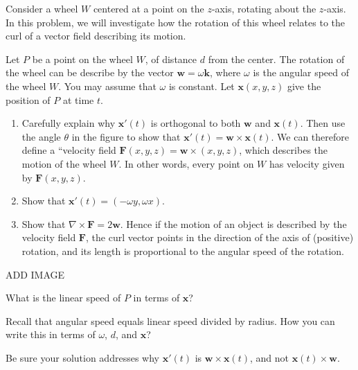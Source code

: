 \begin{problem}
Consider a wheel $W$ centered at a point on the $z$-axis, rotating about the $z$-axis. In this problem, we will investigate how the rotation of this wheel relates to the curl of a vector field describing its motion.

Let $P$ be a point on the wheel $W$, of distance $d$ from the center. The rotation of the wheel can be describe by the vector $\mathbf{w}=\omega\mathbf{k}$, where $\omega$ is the angular speed of the wheel $W$. You may assume that $\omega$ is constant. Let $\mathbf{x}(x,y,z)$ give the position of $P$ at time $t$.

\begin{enumerate}
\item Carefully explain why $\mathbf{x}'(t)$ is orthogonal to both $\mathbf{w}$ and $\mathbf{x}(t)$. Then use the angle $\theta$ in the figure to show that $\mathbf{x}'(t) = \mathbf{w}\times\mathbf{x}(t)$. We can therefore define a ``velocity field $\mathbf{F}(x,y,z) = \mathbf{w}\times(x,y,z)$, which describes the motion of the wheel $W$. In other words, every point on $W$ has velocity given by $\mathbf{F}(x,y,z)$.
\item Show that $\mathbf{x}'(t) = (-\omega y, \omega x)$.
\item Show that $\nabla\times\mathbf{F} = 2\mathbf{w}$. Hence if the motion of an object is described by the velocity field $\mathbf{F}$, the curl vector points in the direction of the axis of (positive) rotation, and its length is proportional to the angular speed of the rotation.
\end{enumerate}

ADD IMAGE

\begin{hint}
What is the linear speed of $P$ in terms of $\mathbf{x}$?

Recall that angular speed equals linear speed divided by radius. How you can write this in terms of $\omega$, $d$, and $\mathbf{x}$?

Be sure your solution addresses why $\mathbf{x}'(t)$ is $\mathbf{w}\times\mathbf{x}(t)$, and not $\mathbf{x}(t)\times\mathbf{w}$.
\end{hint}
\end{problem}